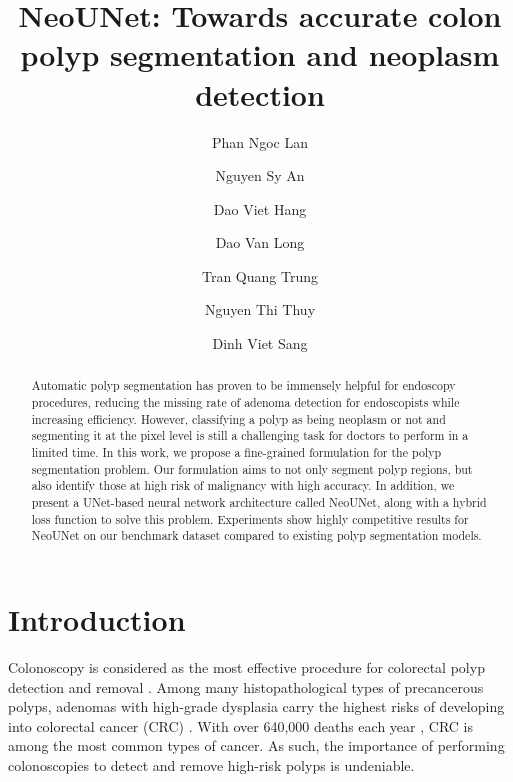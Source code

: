 \documentclass[runningheads]{llncs}
\newcommand{\ModelName}{NeoUNet\xspace}
\begin{document}
	\title{\ModelName{}: Towards accurate colon polyp segmentation and neoplasm detection}

	 \author{
	 	Phan Ngoc Lan
	 	\and Nguyen Sy An
	 	\and Dao Viet Hang
	 	\and Dao Van Long
	 	\and Tran Quang Trung
	 	\and Nguyen Thi Thuy
	 	\and Dinh Viet Sang
	 }



	\maketitle

	\begin{abstract}
		Automatic polyp segmentation has proven to be immensely helpful for endoscopy procedures, reducing the missing rate of adenoma detection for endoscopists while increasing efficiency. However, classifying a polyp as being neoplasm or not and segmenting it at the pixel level is still a challenging task for doctors to perform in a limited time. In this work, we propose a fine-grained formulation for the polyp segmentation problem. Our formulation aims to not only segment polyp regions, but also identify those at high risk of malignancy with high accuracy. In addition, we present a UNet-based neural network architecture called \ModelName, along with a hybrid loss function to solve this problem. Experiments show highly competitive results for \ModelName on our benchmark dataset compared to existing polyp segmentation models.

	\end{abstract}

	\section{Introduction}
	Colonoscopy is considered as the most effective procedure for colorectal polyp detection and removal \cite{issa2017colorectal}. Among many histopathological types of precancerous polyps, adenomas with high-grade dysplasia carry the highest risks of developing into colorectal cancer (CRC) \cite{gschwantler2002high}. With over 640,000 deaths each year \cite{bernal2017comparative}, CRC is among the most common types of cancer. As such, the importance of performing colonoscopies to detect and remove high-risk polyps is undeniable.
\end{document}
